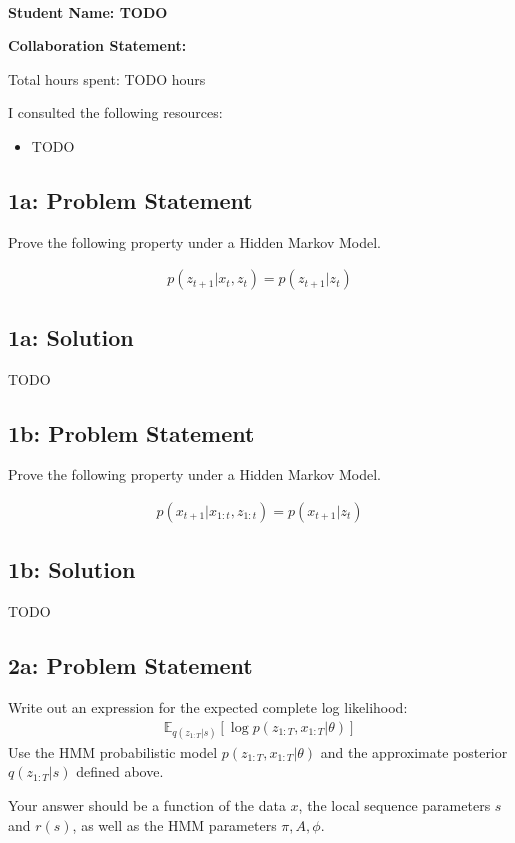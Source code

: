 \documentclass[10pt]{article}
\newcommand{\officialdirections}[1]{{\color{blue} #1}}
\begin{document}
~~\\ %
\Large{\bf Student Name: TODO}

\Large{\bf Collaboration Statement:}

Total hours spent: TODO hours

I consulted the following resources:
\begin{itemize}
\item TODO
\end{itemize}

\tableofcontents

\newpage
\officialdirections{
\subsection*{1a: Problem Statement}
Prove the following property under a Hidden Markov Model.

	\begin{align}
	p(z_{t+1} | x_{t}, z_{t}) = p(z_{t+1} | z_{t} )
	\end{align}

}

\subsection{1a: Solution}

TODO



\newpage
\officialdirections{
\subsection*{1b: Problem Statement}
Prove the following property under a Hidden Markov Model.

	\begin{align}
	p(x_{t+1} | x_{1:t}, z_{1:t}) = p(x_{t+1} | z_t)
	\end{align}
}


\subsection{1b: Solution}

TODO


\newpage
\officialdirections{
\subsection*{2a: Problem Statement}
Write out an expression for the expected complete log likelihood:
\begin{align}
\mathbb{E}_{q(z_{1:T} |s)} \left[ \log p(z_{1:T}, x_{1:T} | \theta) \right]	
\end{align}
Use the HMM probabilistic model $p(z_{1:T}, x_{1:T} | \theta)$ and the approximate posterior $q(z_{1:T} | s)$ defined above. 

Your answer should be a function of the data $x$, the local sequence parameters $s$ and $r(s)$, as well as the HMM parameters $\pi, A, \phi$.
}
\end{document}
